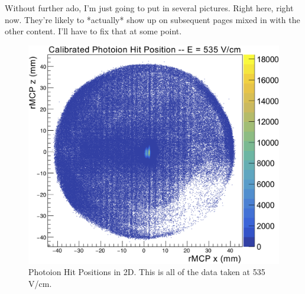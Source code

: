 Without further ado, I'm just going to put in several pictures.  Right here, right now.  They're likely to *actually* show up on subsequent pages mixed in with the other content.  I'll have to fix that at some point.
\begin{figure}[h!!t]
	\centering
	\includegraphics[width=.999\linewidth]
	{Figures/rMCP_PI_2D_535.png}
	\caption[Photoion Hit Positions in 2D]{Photoion Hit Positions in 2D.  This is all of the data taken at 535 V/cm.}	
\end{figure}
